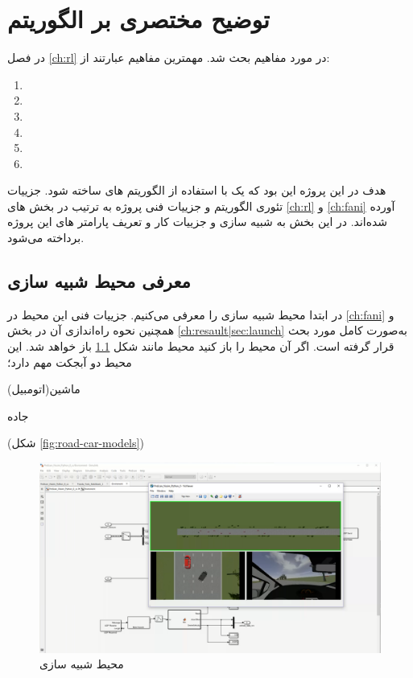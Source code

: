 \chapter{توضیح مختصری بر الگوریتم}

در فصل \ref{ch:rl} در مورد مفاهیم  بحث شد. مهمترین مفاهیم عبارتند از:
\begin{multicols}{3}
\begin{enumerate}
	\item {} \item {} \item {} \item {} \item {} \item {} 
\end{enumerate}
\end{multicols}

هدف در این پروژه این بود که یک  با استفاده از الگوریتم های  ساخته شود. جزییات تئوری الگوریتم و جزییات فنی پروژه به ترتیب در بخش های 
\ref{ch:rl}
و
\ref{ch:fani}
آورده شده‌اند.
در این بخش به شبیه سازی و جزییات کار و تعریف پارامتر های این پروژه برداخته می‌شود.

\section{معرفی محیط شبیه سازی}

در ابتدا محیط شبیه سازی را معرفی می‌کنیم. جزییات فنی این محیط در \ref{ch:fani} و همچنین نحوه راه‌اندازی آن در بخش \ref{ch:resault|sec:launch} به‌صورت کامل مورد بحث قرار گرفته است. اگر آن محیط را باز کنید محیط مانند شکل 
\ref{fig:obs-1}
باز خواهد شد. این محیط دو آبجکت مهم دارد؛
\begin{alphinline}
	\item ماشین(اتومبیل)
	\item جاده
\end{alphinline}
(شکل \ref{fig:road-car-models}) 



\begin{figure}
	\centering
	\includegraphics[width=0.7\linewidth]{Figures/OBS/1}
	\caption{محیط شبیه سازی}
	\label{fig:obs-1}
\end{figure}


